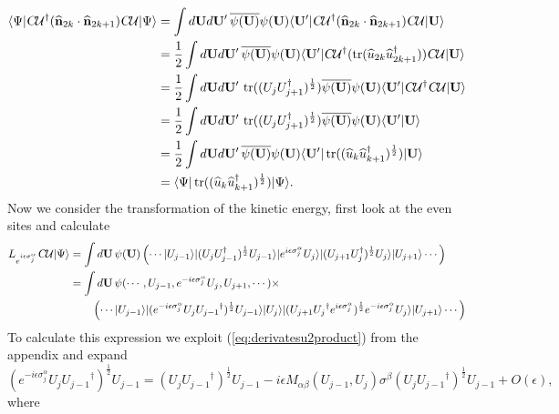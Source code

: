 \documentclass[12pt]{amsart}
\newcommand{\tr}{\operatorname{tr}}
\theoremstyle{definition}
\theoremstyle{remark}
\numberwithin{equation}{section}
\begin{document}
\begin{equation}
	\begin{split}
		\langle \Psi|\textsl{C}\mathcal{U}^\dag (\widehat{\mathbf{n}}_{2k}\cdot \widehat{\mathbf{n}}_{2k+1} )\textsl{C}\mathcal{U}|\Psi\rangle &= \int d\mathbf{U}d\mathbf{U}'\, \overline{\psi(\mathbf{U})}\psi(\mathbf{U})  \langle \mathbf{U}'|\textsl{C}\mathcal{U}^\dag (\widehat{\mathbf{n}}_{2k}\cdot \widehat{\mathbf{n}}_{2k+1} )\textsl{C}\mathcal{U}|\mathbf{U}\rangle \\
		&= \frac12\int d\mathbf{U}d\mathbf{U}'\, \overline{\psi(\mathbf{U})}\psi(\mathbf{U})  \langle \mathbf{U}'|\textsl{C}\mathcal{U}^\dag ( \tr(\widehat{u}_{2k}\widehat{u}^\dag_{2k+1}) )\textsl{C}\mathcal{U}|\mathbf{U}\rangle \\
		&= \frac12\int d\mathbf{U}d\mathbf{U}'\,  \tr((U_{j} U_{j+1}^\dag)^{\frac12} )  \overline{\psi(\mathbf{U})}\psi(\mathbf{U})  \langle \mathbf{U}'|\textsl{C}\mathcal{U}^\dag \textsl{C}\mathcal{U}|\mathbf{U}\rangle \\
		&= \frac12\int d\mathbf{U}d\mathbf{U}'\,  \tr((U_{j} U_{j+1}^\dag)^{\frac12} )  \overline{\psi(\mathbf{U})}\psi(\mathbf{U})  \langle \mathbf{U}'|\mathbf{U}\rangle \\
		&= \frac12\int d\mathbf{U}d\mathbf{U}'\,    \overline{\psi(\mathbf{U})}\psi(\mathbf{U})  \langle \mathbf{U}'|\tr((\widehat{u}_{k}\widehat{u}^\dag_{k+1})^{\frac12} )|\mathbf{U}\rangle \\
		&= \langle \Psi|\tr((\widehat{u}_{k}\widehat{u}^\dag_{k+1})^{\frac12} )|\Psi\rangle.
	\end{split}
\end{equation}
Now we consider the transformation of the kinetic energy, first look at the even sites and calculate
\begin{equation}
	\begin{split}
		L_{e^{i\epsilon \sigma^\alpha_j}}\textsl{C}\mathcal{U} |\Psi\rangle &= \int d\mathbf{U}\,\psi(\mathbf{U}) \left(\cdots |U_{j-1}\rangle |(U_{j} U_{j-1}^\dag)^{\frac12} U_{j-1}\rangle |e^{i\epsilon\sigma^\alpha_j}U_{j}\rangle  |(U_{j+1} U_{j}^\dag)^{\frac12} U_{j}\rangle|U_{j+1}\rangle\cdots\right) \\
		&= \int d\mathbf{U}\,\psi(\cdots, U_{j-1},e^{-i\epsilon\sigma^\alpha_j}U_{j}, U_{j+1},\cdots) \times \\&\quad\quad  \left(\cdots |U_{j-1}\rangle |(e^{-i\epsilon\sigma^\alpha_j}U_{j} {U_{j-1}}^\dag)^{\frac12} U_{j-1}\rangle |U_{j}\rangle  |(U_{j+1} {U_{j}}^\dag e^{i\epsilon\sigma^\alpha_j})^{\frac12} e^{-i\epsilon\sigma^\alpha_j}U_{j}\rangle|U_{j+1}\rangle\cdots \right)
	\end{split}
\end{equation}
To calculate this expression we exploit (\ref{eq:derivatesu2product}) from the appendix and expand
\begin{equation}
	(e^{-i\epsilon\sigma^\alpha_j}U_{j} {U_{j-1}}^\dag)^{\frac12} U_{j-1} = (U_{j} {U_{j-1}}^\dag)^{\frac12} U_{j-1} - i\epsilon M_{\alpha\beta}(U_{j-1}, U_{j})\sigma^\beta(U_{j} {U_{j-1}}^\dag)^{\frac12} U_{j-1} + O(\epsilon),
\end{equation}
where
\end{document}
